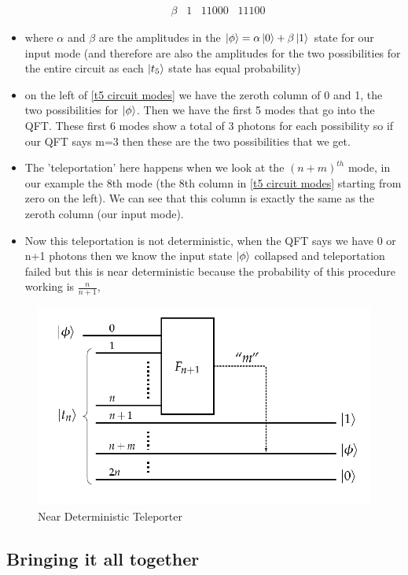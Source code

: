 \begin{itemize}
\begin{align}
        &\beta  \;\;\;1 \;\;\; 11000 \;\;\; 11100
    \end{align}
    \item where $\alpha$ and $\beta$ are the amplitudes in the $\ket{\phi} = \alpha\ket{0} + \beta\ket{1}$ state for our input mode (and therefore are also the amplitudes for the two possibilities for the entire circuit as each $\ket{t_5}$ state has equal probability) 
    \item on the left of \ref{t5 circuit modes} we have the zeroth column of 0 and 1, the two possibilities for $\ket{\phi}$. Then we have the first 5 modes that go into the QFT. These first 6 modes show a total of 3 photons for each possibility so if our QFT says m=3 then these are the two possibilities that we get.
    \item The 'teleportation' here happens when we look at the $(n+m)^{th}$ mode, in our example the 8th mode (the 8th column in \ref{t5 circuit modes} starting from zero on the left). We can see that this column is exactly the same as the zeroth column (our input mode). 
   \item Now this teleportation is not deterministic, when the QFT says we have 0 or n+1 photons then we know the input state $\ket{\phi}$ collapsed and teleportation failed but this is near deterministic because the probability of this procedure working is $\frac{n}{n+1}$,
   
\end{itemize}

\begin{figure}
    \centering
    \includegraphics[scale=0.5]{images/Near Deterministic Teleporter.png}
    \caption{Near Deterministic Teleporter}
    \label{fig:Near deterministic tele}
\end{figure}

\subsection{Bringing it all together}
